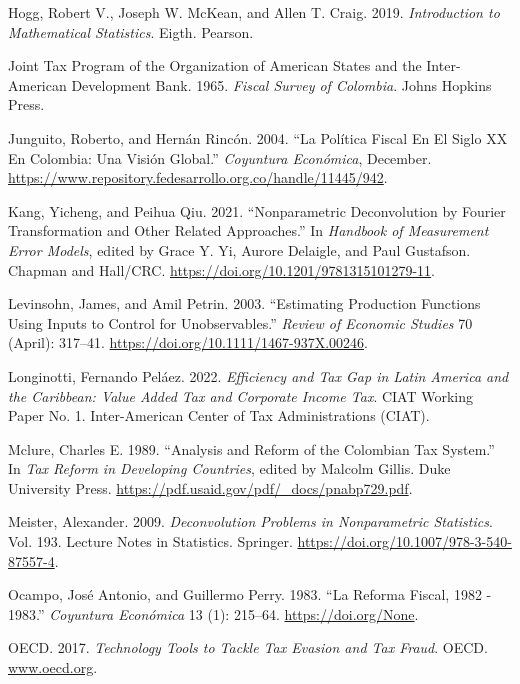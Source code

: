 \documentclass[
  12pt,
  letterpaper,
  oneside,
  openany]{report}
\newlength{\cslhangindent}
\newenvironment{CSLReferences}[2] %
 {\begin{list}{}{%
  \setlength{\itemindent}{0pt}
  \setlength{\leftmargin}{0pt}
  \setlength{\parsep}{0pt}
  \ifodd #1
   \setlength{\leftmargin}{\cslhangindent}
   \setlength{\itemindent}{-1\cslhangindent}
  \fi
  \setlength{\itemsep}{#2\baselineskip}}}
 {\end{list}}
\begin{document}
\begin{CSLReferences}{1}{1}
Hogg, Robert V., Joseph W. McKean, and Allen T. Craig. 2019.
\emph{Introduction to Mathematical Statistics}. Eigth. Pearson.

Joint Tax Program of the Organization of American States and the
Inter-American Development Bank. 1965. \emph{Fiscal Survey of
{Colombia}}. Johns Hopkins Press.

Junguito, Roberto, and Hernán Rincón. 2004. {``La Pol{í}tica Fiscal En
El Siglo {XX} En {Colombia}: Una Visi{ó}n Global.''} \emph{Coyuntura
Econ{ó}mica}, December.
\url{https://www.repository.fedesarrollo.org.co/handle/11445/942}.

Kang, Yicheng, and Peihua Qiu. 2021. {``Nonparametric Deconvolution by
{Fourier} Transformation and Other Related Approaches.''} In
\emph{Handbook of Measurement Error Models}, edited by Grace Y. Yi,
Aurore Delaigle, and Paul Gustafson. {Chapman and Hall/CRC}.
\url{https://doi.org/10.1201/9781315101279-11}.

Levinsohn, James, and Amil Petrin. 2003. {``Estimating Production
Functions Using Inputs to Control for Unobservables.''} \emph{Review of
Economic Studies} 70 (April): 317--41.
\url{https://doi.org/10.1111/1467-937X.00246}.

Longinotti, Fernando Peláez. 2022. \emph{Efficiency and Tax Gap in
{Latin America} and the {Caribbean}: Value Added Tax and Corporate
Income Tax}. CIAT Working Paper No. 1. Inter-American Center of Tax
Administrations (CIAT).

Mclure, Charles E. 1989. {``Analysis and Reform of the Colombian Tax
System.''} In \emph{Tax Reform in Developing Countries}, edited by
Malcolm Gillis. Duke University Press.
\url{https://pdf.usaid.gov/pdf/_docs/pnabp729.pdf}.

Meister, Alexander. 2009. \emph{Deconvolution Problems in Nonparametric
Statistics}. Vol. 193. Lecture Notes in Statistics. Springer.
\url{https://doi.org/10.1007/978-3-540-87557-4}.

Ocampo, José Antonio, and Guillermo Perry. 1983. {``La Reforma Fiscal,
1982 - 1983.''} \emph{Coyuntura Económica} 13 (1): 215--64.
\url{https://doi.org/None}.

OECD. 2017. \emph{Technology Tools to Tackle Tax Evasion and Tax Fraud}.
OECD. \href{https://www.oecd.org}{www.oecd.org}.


\end{CSLReferences}
\end{document}
